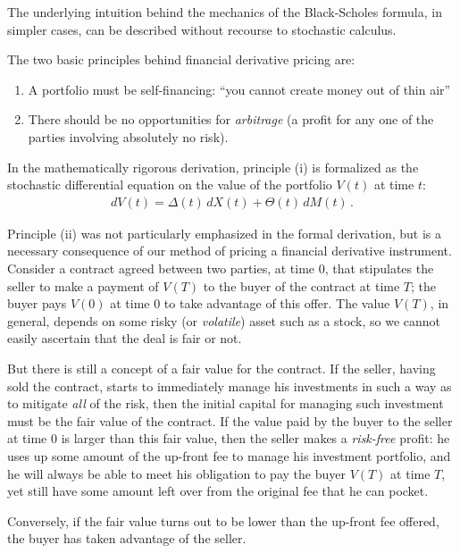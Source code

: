\documentclass[12pt]{article}
\begin{document}
The underlying intuition behind the mechanics of the Black-Scholes formula,
in simpler cases, can be described without recourse to stochastic calculus.

The two basic principles
behind financial derivative pricing are:

\begin{enumerate}[i]
\item
A portfolio must be self-financing: ``you cannot create money out of thin air''
\item
There should be no opportunities for \emph{arbitrage} (a profit for any
one of the parties involving absolutely no risk).
\end{enumerate}

In the mathematically rigorous derivation, principle (i) is formalized
as the stochastic differential equation on the value of the portfolio $V(t)$
at time $t$:
\begin{align}\label{eq:port-self-financing}
d V(t) = \Delta(t) \, dX(t) + \Theta(t) \, dM(t)\,.
\end{align}

Principle (ii) was not particularly emphasized in the formal derivation,
but is a necessary consequence of our method of pricing a financial 
derivative instrument.  Consider a contract agreed between two 
parties, at time $0$, that stipulates the seller to make a payment of $V(T)$
to the buyer of the contract at time $T$; 
the buyer pays $V(0)$ at time $0$ to take advantage of this offer.
The value $V(T)$, in general, depends on some risky (or \emph{volatile})
asset such as a stock, so we cannot easily ascertain that the deal
is fair or not.

But there is still a concept of a fair value for the contract.
If the seller, having sold the contract, starts to immediately
manage his investments in such a way as to mitigate \emph{all} of the risk,
then the initial capital for managing such investment must be the
fair value of the contract.  If the value paid by the buyer to the seller
at time $0$ is larger than this fair value, then the seller makes a 
\emph{risk-free} profit: he uses up some amount of the up-front fee to manage
his investment portfolio, and he will always be able to meet his obligation
to pay the buyer $V(T)$ at time $T$, yet still have some amount left over
from the original fee that he can pocket.

Conversely, if the fair value turns out to be lower than the up-front fee offered,
the buyer has taken advantage of the seller.
\end{document}
